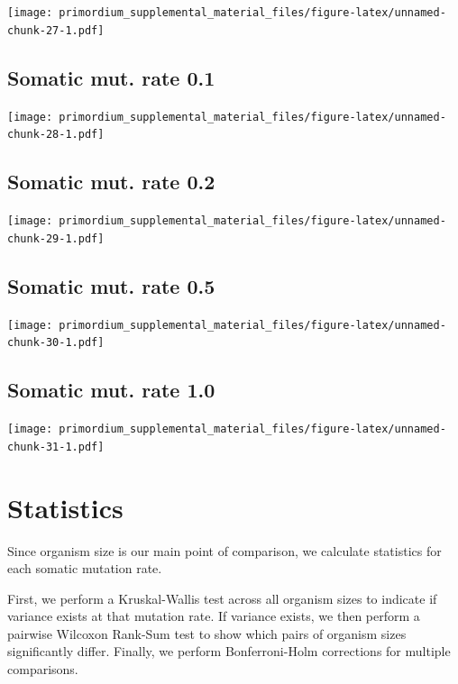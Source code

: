 \documentclass[
]{book}
\begin{document}
\texttt{[image: primordium\_supplemental\_material\_files/figure-latex/unnamed-chunk-27-1.pdf]}

\hypertarget{somatic-mut.-rate-0.1}{%
\subsection{Somatic mut. rate 0.1}\label{somatic-mut.-rate-0.1}}

\texttt{[image: primordium\_supplemental\_material\_files/figure-latex/unnamed-chunk-28-1.pdf]}

\hypertarget{somatic-mut.-rate-0.2}{%
\subsection{Somatic mut. rate 0.2}\label{somatic-mut.-rate-0.2}}

\texttt{[image: primordium\_supplemental\_material\_files/figure-latex/unnamed-chunk-29-1.pdf]}

\hypertarget{somatic-mut.-rate-0.5}{%
\subsection{Somatic mut. rate 0.5}\label{somatic-mut.-rate-0.5}}

\texttt{[image: primordium\_supplemental\_material\_files/figure-latex/unnamed-chunk-30-1.pdf]}

\hypertarget{somatic-mut.-rate-1.0}{%
\subsection{Somatic mut. rate 1.0}\label{somatic-mut.-rate-1.0}}

\texttt{[image: primordium\_supplemental\_material\_files/figure-latex/unnamed-chunk-31-1.pdf]}

\hypertarget{statistics-1}{%
\section{Statistics}\label{statistics-1}}

Since organism size is our main point of comparison, we calculate statistics for each somatic mutation rate.

First, we perform a Kruskal-Wallis test across all organism sizes to indicate if variance exists at that mutation rate.
If variance exists, we then perform a pairwise Wilcoxon Rank-Sum test to show which pairs of organism sizes significantly differ.
Finally, we perform Bonferroni-Holm corrections for multiple comparisons.
\end{document}

